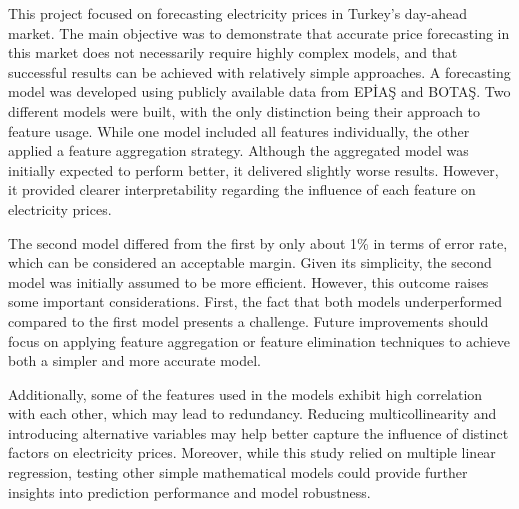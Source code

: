 \documentclass[
]{article}
\begin{document}
This project focused on forecasting electricity prices in Turkey's
day-ahead market. The main objective was to demonstrate that accurate
price forecasting in this market does not necessarily require highly
complex models, and that successful results can be achieved with
relatively simple approaches. A forecasting model was developed using
publicly available data from EPİAŞ and BOTAŞ. Two different models were
built, with the only distinction being their approach to feature usage.
While one model included all features individually, the other applied a
feature aggregation strategy. Although the aggregated model was
initially expected to perform better, it delivered slightly worse
results. However, it provided clearer interpretability regarding the
influence of each feature on electricity prices.

The second model differed from the first by only about 1\% in terms of
error rate, which can be considered an acceptable margin. Given its
simplicity, the second model was initially assumed to be more efficient.
However, this outcome raises some important considerations. First, the
fact that both models underperformed compared to the first model
presents a challenge. Future improvements should focus on applying
feature aggregation or feature elimination techniques to achieve both a
simpler and more accurate model.

Additionally, some of the features used in the models exhibit high
correlation with each other, which may lead to redundancy. Reducing
multicollinearity and introducing alternative variables may help better
capture the influence of distinct factors on electricity prices.
Moreover, while this study relied on multiple linear regression, testing
other simple mathematical models could provide further insights into
prediction performance and model robustness.
\end{document}
